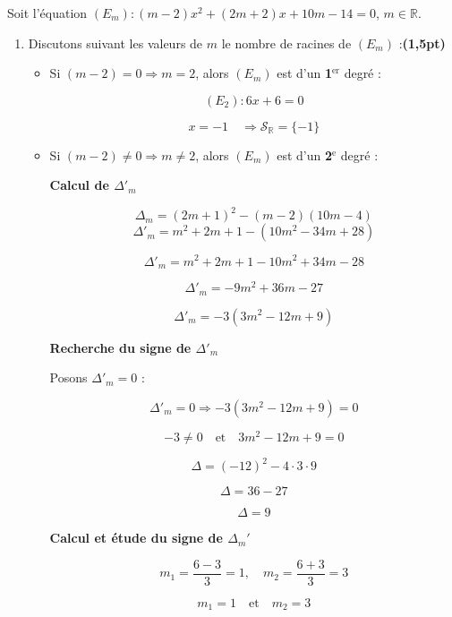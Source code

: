 \documentclass[12pt,a4paper]{article}
\begin{document}
Soit l’équation $(E_m) : (m - 2)x^2 + (2m + 2)x + 10m - 14 = 0$, $m \in \mathbb{R}$.
\begin{enumerate}
    \item Discutons suivant les valeurs de \(m\) le nombre de racines de \((E_m)\) :\hfill \textbf{(1,5pt)}
    
    \begin{itemize}
        \item Si \((m-2) = 0 \Rightarrow m = 2\), alors \((E_m)\) est d'un \textbf{1\(^\text{er}\)} degré :
        
        \[
        (E_2) : 6x + 6 = 0
        \]
        
        \[
        x = -1 \quad \Rightarrow \mathcal{S}_\mathbb{R} = \{-1\}
        \]
        
        \item Si \((m-2) \neq 0 \Rightarrow m \neq 2\), alors \((E_m)\) est d'un \textbf{2\(^\text{e}\)} degré :
        
        \textbf{Calcul de \(\Delta'_m\)}
        
        \[
        \Delta_m = (2m+1)^2 - (m-2)(10m-4)
        \]
\[
\Delta'_m = m^2 + 2m + 1 - (10m^2 - 34m + 28)
\]

\[
\Delta'_m = m^2 + 2m + 1 - 10m^2 + 34m - 28
\]

\[
\Delta'_m = -9m^2 + 36m - 27
\]

\[
\Delta'_m = -3(3m^2 - 12m + 9)
\]

\textbf{Recherche du signe de \(\Delta'_m\)}

Posons \(\Delta'_m = 0\) :

\[
\Delta'_m = 0 \Rightarrow -3(3m^2 - 12m + 9) = 0
\]

\[
-3 \neq 0 \quad \text{et} \quad 3m^2 - 12m + 9 = 0
\]

\[
\Delta = (-12)^2 - 4 \cdot 3 \cdot 9
\]

\[
\Delta = 36 - 27
\]

\[
\Delta = 9
\]

\textbf{Calcul et étude du signe de \(\Delta_m'\)}

\[
m_1 = \frac{6 - 3}{3} = 1, \quad m_2 = \frac{6 + 3}{3} = 3
\]

\[
m_1 = 1 \quad \text{et} \quad m_2 = 3
\]



\end{itemize}
\end{enumerate}
\end{document}
